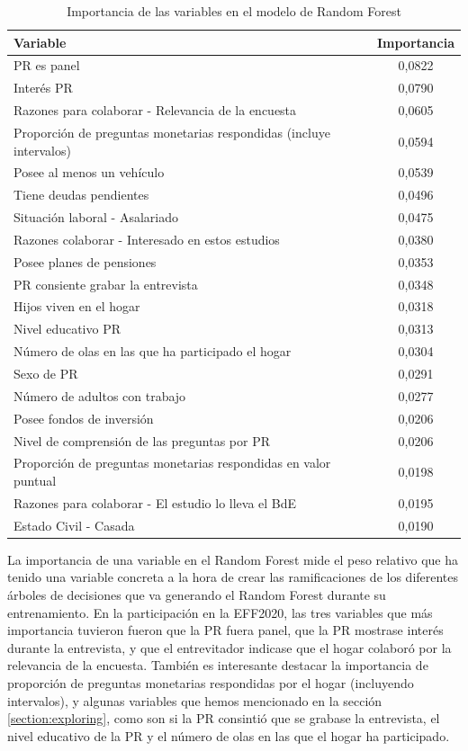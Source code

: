 \begin{table}[ht]
    \centering
    \begin{tabular}{lc}
    \hline
        \textbf{Variable} & \textbf{Importancia} \\ \hline
        PR es panel & 0,0822 \\ 
        Interés PR & 0,0790 \\ 
        Razones para colaborar - Relevancia de la encuesta & 0,0605 \\ 
        Proporción de preguntas monetarias respondidas (incluye intervalos) & 0,0594 \\ 
        Posee al menos un vehículo & 0,0539 \\ 
        Tiene deudas pendientes & 0,0496 \\ 
        Situación laboral - Asalariado & 0,0475 \\ 
        Razones colaborar - Interesado en estos estudios & 0,0380 \\ 
        Posee planes de pensiones & 0,0353 \\ 
        PR consiente grabar la entrevista & 0,0348 \\ 
        Hijos viven en el hogar & 0,0318 \\ 
        Nivel educativo PR & 0,0313 \\ 
        Número de olas en las que ha participado el hogar & 0,0304 \\ 
        Sexo de PR & 0,0291 \\ 
        Número de adultos con trabajo & 0,0277 \\ 
        Posee fondos de inversión & 0,0206 \\ 
        Nivel de comprensión de las preguntas por PR & 0,0206 \\ 
        Proporción de preguntas monetarias respondidas en valor puntual & 0,0198 \\ 
        Razones para colaborar - El estudio lo lleva el BdE & 0,0195 \\ 
        Estado Civil - Casada & 0,0190 \\ \hline
    \end{tabular}
    \caption{Importancia de las variables en el modelo de Random Forest}
    \label{table:importance}
\end{table}

La importancia de una variable en el Random Forest mide el peso relativo que ha tenido una variable concreta a la hora de crear las ramificaciones de los diferentes árboles de decisiones que va generando el Random Forest durante su entrenamiento. En la participación en la EFF2020, las tres variables que más importancia tuvieron fueron que la PR fuera panel, que la PR mostrase interés durante la entrevista, y que el entrevitador indicase que el hogar colaboró por la relevancia de la encuesta. También es interesante destacar la importancia de proporción de preguntas monetarias respondidas por el hogar (incluyendo intervalos), y algunas variables que hemos mencionado en la sección \ref{section:exploring}, como son si la PR consintió que se grabase la entrevista, el nivel educativo de la PR y el número de olas en las que el hogar ha participado.